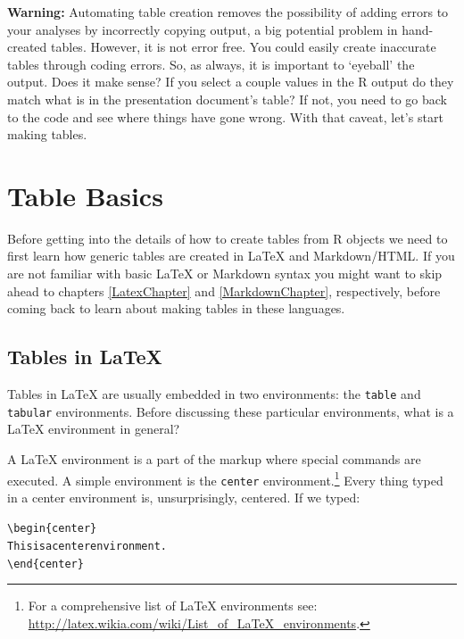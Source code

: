 \textbf{Warning:} Automating table creation removes the possibility of adding errors to your analyses by incorrectly copying output, a big potential problem in hand-created tables. However, it is not error free. You could easily create inaccurate tables through coding errors. So, as always, it is important to `eyeball' the output. Does it make sense? If you select a couple values in the R output do they match what is in the presentation document's table? If not, you need to go back to the code and see where things have gone wrong. With that caveat, let's start making tables.

\section{Table Basics}

Before getting into the details of how to create tables from R objects we need to first learn how generic tables are created in LaTeX and Markdown/HTML. If you are not familiar with basic LaTeX or Markdown syntax you might want to skip ahead to chapters \ref{LatexChapter} and \ref{MarkdownChapter}, respectively, before coming back to learn about making tables in these languages.

\subsection{Tables in LaTeX}

Tables in LaTeX are usually embedded in two environments: the \texttt{table} and \texttt{tabular} environments. Before discussing these particular environments, what is a LaTeX environment in general?

A LaTeX environment is a part of the markup where special commands are executed. A simple environment is the \texttt{center} environment.\footnote{For a comprehensive list of LaTeX environments see: \url{http://latex.wikia.com/wiki/List_of_LaTeX_environments}.} Every thing typed in a center environment is, unsurprisingly, centered. If we typed:

\begin{knitrout}
\color{fgcolor}\begin{kframe}
\begin{alltt}
\textbackslash{}begin\{center\}
    This is a center environment.
\textbackslash{}end\{center\}
\end{alltt}
\end{kframe}
\end{knitrout}


